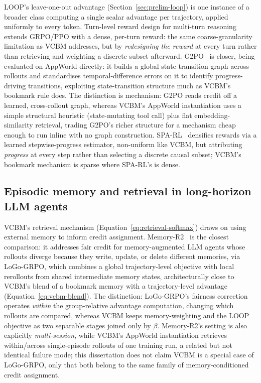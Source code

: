 LOOP's leave-one-out advantage (Section~\ref{sec:prelim-loop}) is one instance of a broader class computing a single scalar advantage per trajectory, applied uniformly to every token. Turn-level reward design for multi-turn reasoning~\cite{multi_turn_grpo2025} extends GRPO/PPO with a dense, per-turn reward: the same coarse-granularity limitation as VCBM addresses, but by \emph{redesigning the reward} at every turn rather than retrieving and weighting a discrete subset afterward. G2PO~\cite{g2po2026} is closer, being evaluated on AppWorld directly: it builds a global state-transition graph across rollouts and standardises temporal-difference errors on it to identify progress-driving transitions, exploiting state-transition structure much as VCBM's bookmark rule does. The distinction is mechanism: G2PO reads credit off a learned, cross-rollout graph, whereas VCBM's AppWorld instantiation uses a simple structural heuristic (state-mutating tool call) plus flat embedding-similarity retrieval, trading G2PO's richer structure for a mechanism cheap enough to run inline with no graph construction. SPA-RL~\cite{spa_rl2025} densifies rewards via a learned stepwise-progress estimator, non-uniform like VCBM, but attributing \emph{progress} at every step rather than selecting a discrete causal subset; VCBM's bookmark mechanism is sparse where SPA-RL's is dense.

\subsection{Episodic memory and retrieval in long-horizon LLM agents}
\label{sec:rw-memory}

VCBM's retrieval mechanism (Equation~\ref{eq:retrieval-softmax}) draws on using external memory to inform credit assignment. Memory-R2~\cite{memoryr22026} is the closest comparison: it addresses fair credit for memory-augmented LLM agents whose rollouts diverge because they write, update, or delete different memories, via LoGo-GRPO, which combines a global trajectory-level objective with local rerollouts from shared intermediate memory states, architecturally close to VCBM's blend of a bookmark memory with a trajectory-level advantage (Equation~\ref{eq:vcbm-blend}). The distinction: LoGo-GRPO's fairness correction operates \emph{within} the group-relative advantage computation, changing which rollouts are compared, whereas VCBM keeps memory-weighting and the LOOP objective as two separable stages joined only by $\beta$. Memory-R2's setting is also explicitly \emph{multi-session}, while VCBM's AppWorld instantiation retrieves within/across single-episode rollouts of one training run, a related but not identical failure mode; this dissertation does not claim VCBM is a special case of LoGo-GRPO, only that both belong to the same family of memory-conditioned credit assignment.

